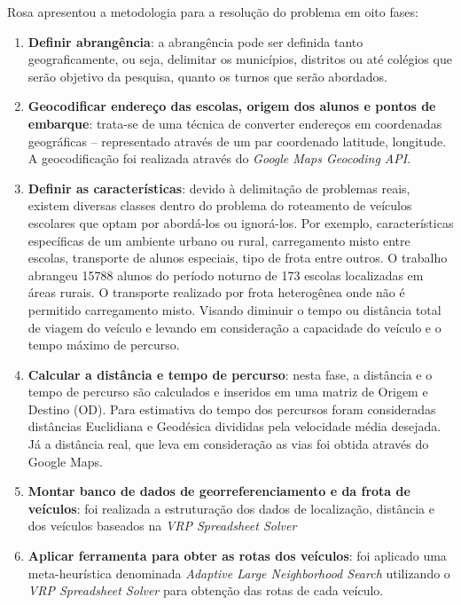 Rosa apresentou a metodologia para a resolução do problema em oito fases:
\begin{enumerate}
    \item \textbf{Definir abrangência}: a abrangência pode ser definida tanto geograficamente, ou seja, delimitar os municípios, distritos ou até colégios que serão objetivo da pesquisa, quanto os turnos que serão abordados.
    
    \item \textbf{Geocodificar endereço das escolas, origem dos alunos e pontos de embarque}: trata-se de uma técnica de converter endereços em coordenadas geográficas -- representado através de um par coordenado latitude, longitude. A geocodificação foi realizada através do \emph{Google Maps Geocoding API}.
    
    \item \textbf{Definir as características}: devido à delimitação de problemas reais, existem diversas classes dentro do problema do roteamento de veículos escolares que optam por abordá-los ou ignorá-los. Por exemplo, características específicas de um ambiente urbano ou rural, carregamento misto entre escolas, transporte de alunos especiais, tipo de frota entre outros. O trabalho abrangeu 15788 alunos do período noturno de 173 escolas localizadas em áreas rurais. O transporte realizado por frota heterogênea onde não é permitido carregamento misto. Visando diminuir o tempo ou distância total de viagem do veículo e levando em consideração a capacidade do veículo e o tempo máximo de percurso.
    
    \item \textbf{Calcular a distância e tempo de percurso}: nesta fase, a distância e o tempo de percurso são calculados e inseridos em uma matriz de Origem e Destino (OD). Para estimativa do tempo dos percursos foram consideradas distâncias Euclidiana e Geodésica divididas pela velocidade média desejada. Já a distância real, que leva em consideração as vias foi obtida através do Google Maps.
    
    \item \textbf{Montar banco de dados de georreferenciamento e da frota de veículos}: foi realizada a estruturação dos dados de localização, distância e dos veículos baseados na \emph{VRP Spreadsheet Solver}
    
    \item \textbf{Aplicar ferramenta para obter as rotas dos veículos}: foi aplicado uma meta-heurística denominada \emph{Adaptive Large Neighborhood Search} utilizando o \emph{VRP Spreadsheet Solver} para obtenção das rotas de cada veículo.    
    

\end{enumerate}
